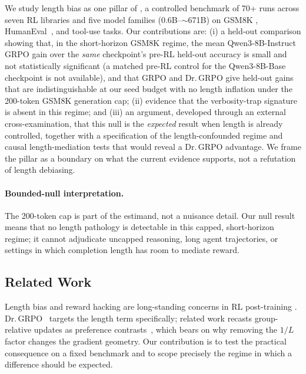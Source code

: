 We study length bias as one pillar of \ours{}, a controlled benchmark of 70+ runs
across seven RL libraries and five model families ($0.6$B--$\sim$671B) on GSM8K
\citep{cobbe2021training}, HumanEval~\citep{chen2021codex}, and tool-use tasks. Our
contributions are: (i) a held-out comparison showing that, in the short-horizon
GSM8K regime, the mean Qwen3-8B-Instruct GRPO gain over the \emph{same} checkpoint's
pre-RL held-out accuracy is small and not statistically significant (a matched pre-RL
control for the Qwen3-8B-Base checkpoint is not available), and that GRPO and Dr.\,GRPO give held-out gains
that are indistinguishable at our seed budget with no length inflation under the
200-token GSM8K generation cap; (ii) evidence that the verbosity-trap signature is
absent in this regime; and (iii) an argument, developed through an external
cross-examination, that this null is the \emph{expected} result when length is
already controlled, together with a specification of the length-confounded regime
and causal length-mediation tests that would reveal a Dr.\,GRPO advantage. We frame
the pillar as a boundary on what the current evidence supports, not a refutation of
length debiasing.

\paragraph{Bounded-null interpretation.}
The 200-token cap is part of the estimand, not a nuisance detail. Our null result
means that no length pathology is detectable in this capped, short-horizon regime;
it cannot adjudicate uncapped reasoning, long agent trajectories, or settings in
which completion length has room to mediate reward.

\subsection{Related Work}
\label{sec:p4-related}
Length bias and reward hacking are long-standing concerns in RL post-training
\citep{ouyang2022training, christiano2017deeprlhf, ahmadian2024backtobasics}.
Dr.\,GRPO~\citep{tong2025drgrpo} targets the length term specifically; related work
recasts group-relative updates as preference contrasts~\citep{wu2025grpodpo}, which bears on why removing the $1/L$ factor changes the gradient
geometry. Our contribution is to test the practical consequence on a fixed
benchmark and to scope precisely the regime in which a difference should be
expected.
